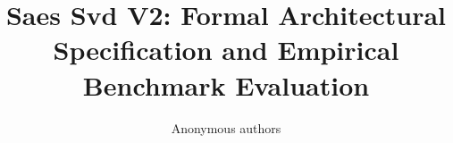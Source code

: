 \title{\textbf{Saes Svd V2: Formal Architectural Specification and Empirical Benchmark Evaluation}}

\author{Anonymous authors}
